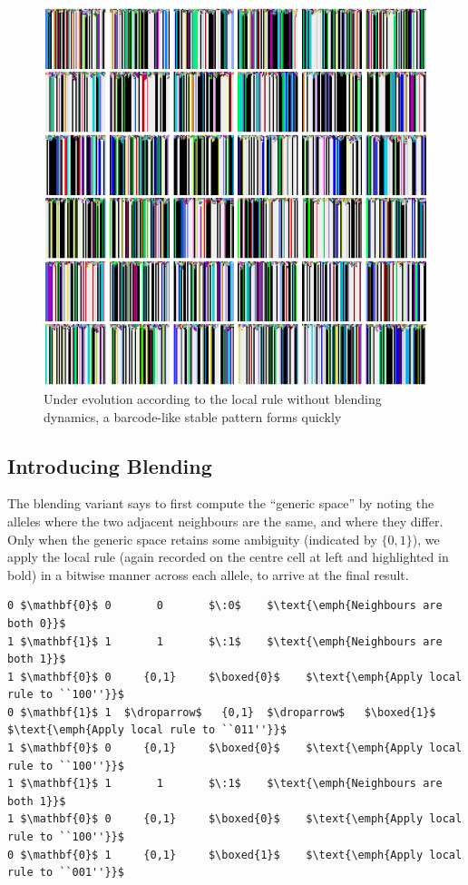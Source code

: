 \documentclass{AISB2008}
\makeatletter
\renewcommand{\boxed}[1]{\text{\fboxsep=.2em\fbox{\m@th$\displaystyle#1$}}}
\newcommand{\droparrow}{%
  \mathchoice{\raisebox{-4pt}{$\displaystyle\mapsto$}}
             {\raisebox{-4pt}{$\mapsto$}}
             {\raisebox{-2pt}{$\scriptstyle\mapsto$}}
             {\raisebox{-2pt}{$\scriptscriptstyle\mapsto$}}}
\makeatother
\begin{document}
\begin{figure}
\includegraphics[width=\columnwidth,trim = 135mm 177mm 0mm 0mm,clip=true]{paint-drips.png}
\caption{Under evolution according to the local rule without blending
  dynamics, a barcode-like stable pattern forms
  quickly\label{barcode}}
\end{figure}

\subsection{Introducing Blending} \label{introducing-blending}


The blending variant says to first compute the ``generic space'' by
noting the alleles where the two adjacent neighbours are the same, and
where they differ.  Only when the generic space retains some ambiguity
(indicated by $\{0,1\}$), we apply the local rule (again recorded on
the centre cell at left and highlighted in bold) in a bitwise manner
across each allele, to arrive at the final result.

\lstset{
  xleftmargin=.05\columnwidth, xrightmargin=.01\columnwidth
}

\begin{lstlisting}[mathescape]
0 $\mathbf{0}$ 0       0       $\:0$    $\text{\emph{Neighbours are both 0}}$
1 $\mathbf{1}$ 1       1       $\:1$    $\text{\emph{Neighbours are both 1}}$
1 $\mathbf{0}$ 0     {0,1}     $\boxed{0}$    $\text{\emph{Apply local rule to ``100''}}$
0 $\mathbf{1}$ 1  $\droparrow$   {0,1}  $\droparrow$   $\boxed{1}$    $\text{\emph{Apply local rule to ``011''}}$
1 $\mathbf{0}$ 0     {0,1}     $\boxed{0}$    $\text{\emph{Apply local rule to ``100''}}$
1 $\mathbf{1}$ 1       1       $\:1$    $\text{\emph{Neighbours are both 1}}$
1 $\mathbf{0}$ 0     {0,1}     $\boxed{0}$    $\text{\emph{Apply local rule to ``100''}}$
0 $\mathbf{0}$ 1     {0,1}     $\boxed{1}$    $\text{\emph{Apply local rule to ``001''}}$
\end{lstlisting}
\end{document}
